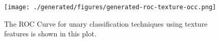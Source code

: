 \documentclass[letterpaper, notitlepage]{report}
\begin{document}
\begin{figure}[H]
	\centering
	\texttt{[image: ./generated/figures/generated-roc-texture-occ.png]}
	\caption[ROC Curve for unary classification using texture features]{The ROC Curve for unary classification techniques using texture features is shown in this plot.}
	\label{fig:roc-texture-occ}
\end{figure}

%

%
%



\end{document}
